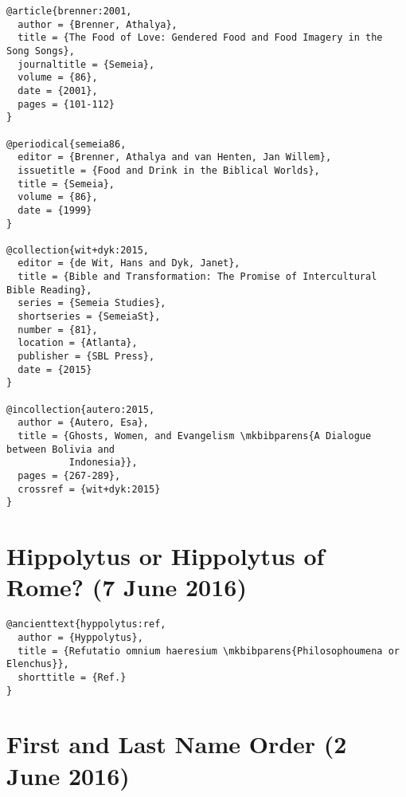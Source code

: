 \documentclass[a4paper]{article}
\begin{document}
\begin{verbatim}
@article{brenner:2001,
  author = {Brenner, Athalya},
  title = {The Food of Love: Gendered Food and Food Imagery in the Song Songs},
  journaltitle = {Semeia},
  volume = {86},
  date = {2001},
  pages = {101-112}
}

@periodical{semeia86,
  editor = {Brenner, Athalya and van Henten, Jan Willem},
  issuetitle = {Food and Drink in the Biblical Worlds},
  title = {Semeia},
  volume = {86},
  date = {1999}
}

@collection{wit+dyk:2015,
  editor = {de Wit, Hans and Dyk, Janet},
  title = {Bible and Transformation: The Promise of Intercultural Bible Reading},
  series = {Semeia Studies},
  shortseries = {SemeiaSt},
  number = {81},
  location = {Atlanta},
  publisher = {SBL Press},
  date = {2015}
}

@incollection{autero:2015,
  author = {Autero, Esa},
  title = {Ghosts, Women, and Evangelism \mkbibparens{A Dialogue between Bolivia and
           Indonesia}},
  pages = {267-289},
  crossref = {wit+dyk:2015}
}
\end{verbatim}

\begin{verbcite}
  \nocite{brenner:2001, semeia86, wit+dyk:2015, autero:2015}
\end{verbcite}
\exampleabbreviations
\examplebibliography
{}

\section{Hippolytus or Hippolytus of Rome?  (7 June 2016)}

\begin{verbatim}
@ancienttext{hyppolytus:ref,
  author = {Hyppolytus},
  title = {Refutatio omnium haeresium \mkbibparens{Philosophoumena or Elenchus}},
  shorttitle = {Ref.}
}
\end{verbatim}

\begin{verbcite}
  \nocite{hyppolytus:ref}
\end{verbcite}
\exampleancientsources
{}

\section{First and Last Name Order (2 June 2016)}
\end{document}
